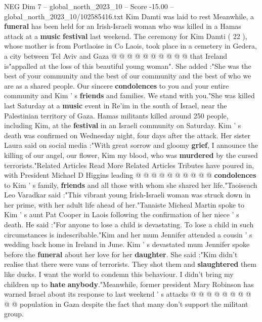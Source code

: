 \begin{textsample}{NEG Dim 7 – global\_north\_2023\_10 – Score -15.00 – global\_north\_2023\_10/102585416.txt}
Kim Damti was laid to rest Meanwhile, a \textbf{funeral} has been held for an Irish-Israeli woman who was killed in a Hamas attack at a \textbf{music} \textbf{festival} last weekend.
The ceremony for Kim Damti ( 22 ), whose mother is from Portlaoise in Co Laois, took place in a cemetery in Gedera, a city between Tel Aviv and Gaza @ @ @ @ @ @ @ @ @ @ that Ireland is"appalled at the loss of this beautiful young woman".
She added :"She was the best of your community and the best of our community and the best of who we are as a shared people.
Our sincere \textbf{condolences} to you and your entire community and Kim ' s \textbf{friends} and families.
We stand with you."She was killed last Saturday at a \textbf{music} event in Re'im in the south of Israel, near the Palestinian territory of Gaza.
Hamas militants killed around 250 people, including Kim, at the \textbf{festival} in an Israeli community on Saturday.
Kim ' s death was confirmed on Wednesday night, four days after the attack.
Her sister Laura said on social media :"With great sorrow and gloomy \textbf{grief}, I announce the killing of our angel, our flower, Kim my blood, who was \textbf{murdered} by the cursed terrorists."Related Articles Read More Related Articles Tributes have poured in, with President Michael D Higgins leading @ @ @ @ @ @ @ @ @ @ \textbf{condolences} to Kim ' s family, \textbf{friends} and all those with whom she shared her life."Taoiseach Leo Varadkar said :"This vibrant young Irish-Israeli woman was struck down in her prime, with her adult life ahead of her."Tanaiste Micheal Martin spoke to Kim ' s aunt Pat Cooper in Laois following the confirmation of her niece ' s death.
He said :"For anyone to lose a child is devastating.
To lose a child in such circumstances is indescribable."Kim and her mum Jennifer attended a cousin ' s wedding back home in Ireland in June.
Kim ' s devastated mum Jennifer spoke before the \textbf{funeral} about her love for her \textbf{daughter}.
She said :"Kim didn't realise that there were vans of terrorists.
They shot them and \textbf{slaughtered} them like ducks.
I want the world to condemn this behaviour.
I didn't bring my children up to \textbf{hate} \textbf{anybody}."Meanwhile, former president Mary Robinson has warned Israel about its response to last weekend ' s attacks @ @ @ @ @ @ @ @ @ @ population in Gaza despite the fact that many don't support the militant group.

\end{textsample}
